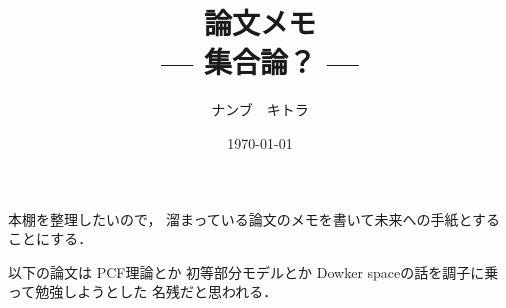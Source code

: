 \documentclass[leqno, a4paper, 12pt]{jsarticle}
\title{論文メモ
\large{\\--- 集合論？ ---}
}
\author{ナンブ　キトラ}
\date{\today}
\begin{document}
\maketitle

本棚を整理したいので，
溜まっている論文のメモを書いて未来への手紙とすることにする．



以下の論文は
PCF理論とか
初等部分モデルとか
Dowker spaceの話を調子に乗って勉強しようとした
名残だと思われる．

\nocite{*}


\end{document}
